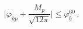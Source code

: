 \begin{equation} \label{inequal1}
\Biggl|\varphi_{kp}+ \frac{M_{p}}{\sqrt{12 \pi}} \Biggr| \leq
\varphi_{b}^{60} \, .
\end{equation}

